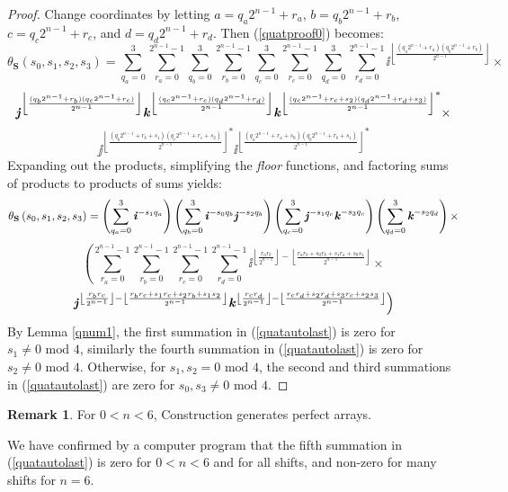 \documentclass[12pt]{article}
\def\mod{\text{ mod }} %
\theoremstyle{definition}
\newtheorem{remark}{Remark}
\begin{document}
\begin{proof}
Change coordinates by letting $a = q_a 2^{n-1} + r_a$, 
$b = q_b 2^{n-1} + r_b$, $c = q_c 2^{n-1} + r_c$, and $d = q_d 2^{n-1} + r_d$. Then
(\ref{quatproof0}) becomes: 
$$\theta_{\textbf{S}}\left(s_0,s_1,s_2,s_3 \right) = \sum_{q_a=0}^3\sum_{r_a=0}^{2^{n-1}-1}
\sum_{q_b=0}^3\sum_{r_b=0}^{2^{n-1}-1}
\sum_{q_c=0}^3\sum_{r_c=0}^{2^{n-1}-1}
\sum_{q_d=0}^3\sum_{r_d=0}^{2^{n-1}-1}
\ii^{\left\lfloor\frac{(q_a2^{n-1}+r_a)(q_b2^{n-1}+r_b)}{2^{n-1}}\right\rfloor}
\times$$
$$\textbf{\textit{j}}^{\left\lfloor\frac{(q_b2^{n-1}+r_b)(q_c2^{n-1}+r_c)}{2^{n-1}}\right\rfloor}
\textbf{\textit{k}}^{\left\lfloor\frac{(q_c2^{n-1}+r_c)(q_d2^{n-1}+r_d)}{2^{n-1}}\right\rfloor}
{\textbf{\textit{k}}^{\left\lfloor\frac{(q_c2^{n-1}+r_c+s_2)(q_d2^{n-1}+r_d+s_3)}{2^{n-1}}\right\rfloor}}^*
\times$$
$${\jj^{\left\lfloor\frac{(q_b2^{n-1}+r_b+s_1)(q_c2^{n-1}+r_c+s_2)}{2^{n-1}}\right\rfloor}}^*
{\ii^{\left\lfloor\frac{(q_a2^{n-1}+r_a+s_0)(q_b2^{n-1}+r_b+s_1)}{2^{n-1}}\right\rfloor}}^*
$$
Expanding out the products, simplifying the {\it floor} functions, and
factoring sums of products to products of sums yields: 
$$\theta_{\textbf{S}}\left(s_0,s_1,s_2,s_3 \right) = 
\left(\sum_{q_a=0}^3 \textbf{\textit{i}}^{-s_1q_a}\right)
\left(\sum_{q_b=0}^3 \textbf{\textit{i}}^{-s_0q_b} \textbf{\textit{j}}^{-s_2q_b}\right)
\left(\sum_{q_c=0}^3 \textbf{\textit{j}}^{-s_1q_c} \textbf{\textit{k}}^{-s_3q_c} \right)
\left(\sum_{q_d=0}^3 \textbf{\textit{k}}^{-s_2q_d}\right)\times$$
$$\left(
\sum_{r_a=0}^{2^{n-1}-1}
\sum_{r_b=0}^{2^{n-1}-1}
\sum_{r_c=0}^{2^{n-1}-1}
\sum_{r_d=0}^{2^{n-1}-1}
\ii^{\left\lfloor\frac{r_ar_b}{2^{n-1}}\right\rfloor - 
\left\lfloor\frac{r_ar_b+s_0r_b+s_1r_a+s_0s_1}{2^{n-1}}\right\rfloor}
\times\right.$$
\begin{equation}
\left.\textbf{\textit{j}}^{\left\lfloor\frac{r_br_c}{2^{n-1}}\right\rfloor - 
\left\lfloor\frac{r_br_c+s_1r_c+s_2r_b+s_1s_2}{2^{n-1}}\right\rfloor}
\textbf{\textit{k}}^{\left\lfloor\frac{r_cr_d}{2^{n-1}}\right\rfloor - 
\left\lfloor\frac{r_cr_d+s_2r_d+s_3r_c+s_2s_3}{2^{n-1}}\right\rfloor}
\right)\label{quatautolast}
\end{equation}
By Lemma \ref{qnum1}, the first summation in (\ref{quatautolast}) 
is zero for $s_1 \neq 0 \mod 4$, similarly the fourth summation 
in (\ref{quatautolast}) is zero for $s_2 \neq 0 \mod 4$. Otherwise, 
for $s_1,s_2 = 0 \mod 4$, the second and third summations in 
(\ref{quatautolast}) are zero for $s_0, s_3 \neq 0 \mod 4$. 
\end{proof}

\begin{remark}
For $0<n<6$, Construction 
generates perfect arrays. 
\end{remark}

We have confirmed by a computer program that the fifth summation in 
(\ref{quatautolast}) is zero for $0<n<6$ and for all shifts, and 
non-zero for many shifts for $n=6$. 
\end{document}
